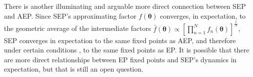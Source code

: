 There is another illuminating and arguable more direct connection between SEP and AEP. Since SEP's approximating factor $f(\bm{\theta})$ converges, in expectation, to the geometric average of the intermediate factors $\bar{f}(\bm{\theta}) \propto [\prod_{n=1}^N f_n(\bm{\theta})]^{\frac{1}{N}}$, SEP converges in expectation to the same fixed points as AEP, and therefore under certain conditions \cite{barthelme:aep}, to the same fixed points as EP. 
%
It is possible that there are more direct relationships between EP fixed points and SEP's dynamics in expectation, but that is still an open question.








